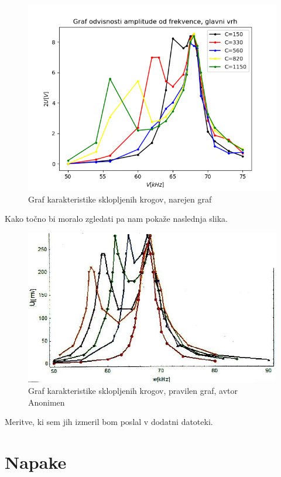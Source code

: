 \documentclass[11pt, a4paper]{article}
\theoremstyle{definition}
\theoremstyle{example}
\theoremstyle{izrek}
\begin{document}
\begin{figure}[htp]
    \centering
    \includegraphics[width=12cm]{Graf odvisnosti amplitude od frekvence ožji.png}
    \caption{Graf karakteristike sklopljenih krogov, narejen graf}
\end{figure}

Kako točno bi moralo zgledati pa nam pokaže naslednja slika.

\begin{figure}[htp]
    \centering
    \includegraphics[width=12cm]{Pravilna meritev.png}
    \caption{Graf karakteristike sklopljenih krogov, pravilen graf, avtor Anonimen}
\end{figure}

Meritve, ki sem jih izmeril bom poslal v dodatni datoteki. 

\pagebreak
\section{Napake}
\end{document}
